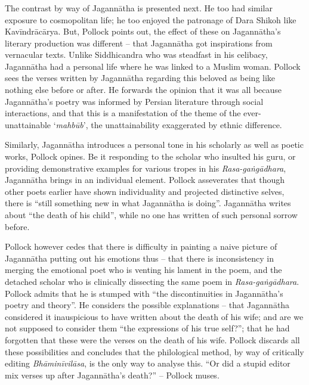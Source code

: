 \subsubsection{} The contrast by way of Jagannātha is presented next. He too had similar exposure to cosmopolitan life; he too enjoyed the patronage of Dara Shikoh like Kavīndrācārya. But, Pollock points out, the effect of these on Jagannātha’s literary production was different – that Jagannātha got inspirations from vernacular texts. Unlike Siddhicandra who was steadfast in his celibacy, Jagannātha had a personal life where he was linked to a Muslim woman. Pollock sees the verses written by Jagannātha regarding this beloved as being like nothing else before or after. He forwards the opinion that it was all because Jagannātha’s poetry was informed by Persian literature through social interactions, and that this is a manifestation of the theme of the ever-unattainable ‘{\sl mahbūb}’, the unattainability exaggerated by ethnic difference. 

Similarly, Jagannātha introduces a personal tone in his scholarly as well as poetic works, Pollock opines. Be it responding to the scholar who insulted his guru, or providing demonstrative examples for various tropes in his {\sl Rasa-gaṅgādhara}, Jagannātha brings in an individual element. Pollock asseverates that though other poets earlier have shown individuality and projected distinctive selves, there is “still something new in what Jagannātha is doing”. Jagannātha writes about “the death of his child”, while no one has written of such personal sorrow before. 

Pollock however cedes that there is difficulty in painting a naive picture of Jagannātha putting out his emotions thus – that there is inconsistency in merging the emotional poet who is venting his lament in the poem, and the detached scholar who is clinically dissecting the same poem in {\sl Rasa-gaṅgādhara}. Pollock admits that he is stumped with “the discontinuities in Jagannātha’s poetry and theory”. He considers the possible explanations – that Jagannātha considered it inauspicious to have written about the death of his wife; and are we not supposed to consider them “the expressions of his true self?”; that he had forgotten that these were the verses on the death of his wife. Pollock discards all these possibilities and concludes that the philological method, by way of critically editing {\sl Bhāminīvilāsa}, is the only way to analyse this. “Or did a stupid editor mix verses up after Jagannātha’s death?” – Pollock muses.

